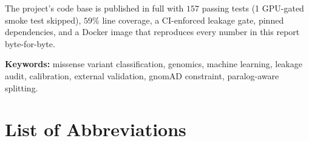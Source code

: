 \documentclass[11pt,a4paper,oneside]{report}
\begin{document}
The project's code base is published in full with $157$ passing
tests (1 GPU-gated smoke test skipped), $59\%$ line coverage,
a CI-enforced leakage gate, pinned dependencies, and a Docker
image that reproduces every number in this report byte-for-byte.

\textbf{Keywords:} missense variant classification, genomics, machine
learning, leakage audit, calibration, external validation, gnomAD
constraint, paralog-aware splitting.
\clearpage

\renewcommand{\contentsname}{Table of Contents}
\tableofcontents
\clearpage
\listoffigures
{}
\clearpage
\listoftables
{}
\clearpage

\chapter*{List of Abbreviations}
\end{document}
